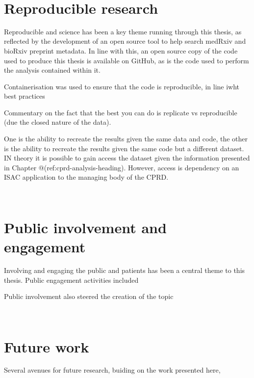 \documentclass[a4paper, twoside]{templates/ociamthesis}
\begin{document}
~

\hypertarget{reproducible-research}{%
\section{Reproducible research}\label{reproducible-research}}

Reproducible and science has been a key theme running through this thesis, as reflected by the development of an open source tool to help search medRxiv and bioRxiv preprint metadata. In line with this, an open source copy of the code used to produce this thesis is available on GitHub, as is the code used to perform the analysis contained within it.

Containerisation was used to ensure that the code is reproducible, in line iwht best practices

Commentary on the fact that the best you can do is replicate vs reproducible (due the closed nature of the data).

One is the ability to recreate the results given the same data and code, the other is the ability to recreate the results given the same code but a different dataset. IN theory it is possible to gain access the dataset given the information presented in Chapter @(ref:cprd-analysis-heading). However, access is dependency on an ISAC application to the managing body of the CPRD.

~

\hypertarget{disc-PPI}{%
\section{Public involvement and engagement}\label{disc-PPI}}

Involving and engaging the public and patients has been a central theme to this thesis.
Public engagement activities included

Public involvement also steered the creation of the topic

~

\hypertarget{future-work-1}{%
\section{Future work}\label{future-work-1}}

Several avenues for future research, buiding on the work presented here,

\hypertarget{section}{%
\subsection{}\label{section}}
\end{document}
